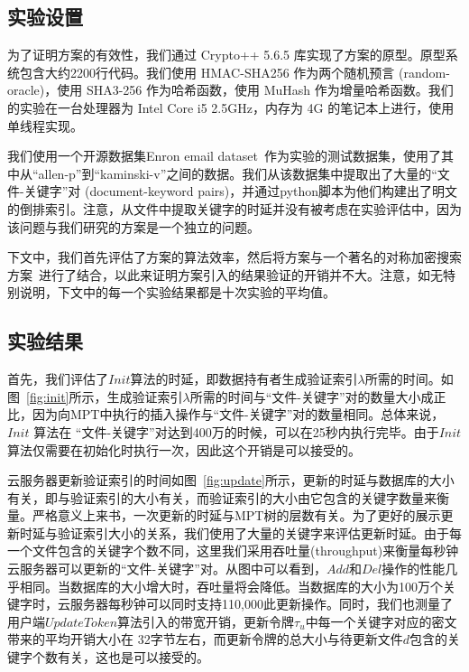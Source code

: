 \subsection{实验设置}
为了证明方案\single 的有效性，我们通过 Crypto++ 5.6.5 库实现了方案的原型。原型系统包含大约2200行代码。我们使用 HMAC-SHA256 作为两个随机预言 (random-oracle)，使用 SHA3-256 作为哈希函数，使用 MuHash 作为增量哈希函数。我们的实验在一台处理器为 Intel Core i5 2.5GHz，内存为 4G 的笔记本上进行，使用单线程实现。

我们使用一个开源数据集Enron email dataset~\cite{enron_email}作为实验的测试数据集，使用了其中从“allen-p”到“kaminski-v”之间的数据。我们从该数据集中提取出了大量的“文件-关键字”对 (document-keyword pairs)，并通过python脚本为他们构建出了明文的倒排索引。注意，从文件中提取关键字的时延并没有被考虑在实验评估中，因为该问题与我们研究的\single 方案是一个独立的问题。

下文中，我们首先评估了\single 方案的算法效率，然后将\single 方案与一个著名的对称加密搜索方案~\cite{cash2014dynamic}进行了结合，以此来证明\single 方案引入的结果验证的开销并不大。注意，如无特别说明，下文中的每一个实验结果都是十次实验的平均值。


\subsection{实验结果}
首先，我们评估了$Init$算法的时延，即数据持有者生成验证索引$\lambda$所需的时间。如图~\ref{fig:init}所示，生成验证索引$\lambda$所需的时间与“文件-关键字”对的数量大小成正比，因为向MPT中执行的插入操作与“文件-关键字”对的数量相同。总体来说，$Init$ 算法在 “文件-关键字”对达到400万的时候，可以在25秒内执行完毕。由于$Init$算法仅需要在初始化时执行一次，因此这个开销是可以接受的。

云服务器更新验证索引的时间如图~\ref{fig:update}所示，更新的时延与数据库的大小有关，即与验证索引的大小有关，而验证索引的大小由它包含的关键字数量来衡量。严格意义上来书，一次更新的时延与MPT树的层数有关。为了更好的展示更新时延与验证索引大小的关系，我们使用了大量的关键字来评估更新时延。由于每一个文件包含的关键字个数不同，这里我们采用吞吐量(throughput)来衡量每秒钟云服务器可以更新的“文件-关键字”对。从图中可以看到，$Add$和$Del$操作的性能几乎相同。当数据库的大小增大时，吞吐量将会降低。当数据库的大小为100万个关键字时，云服务器每秒钟可以同时支持110,000此更新操作。同时，我们也测量了用户端$UpdateToken$算法引入的带宽开销，更新令牌$\tau_u$中每一个关键字对应的密文带来的平均开销大小在 32字节左右，而更新令牌的总大小与待更新文件$d$包含的关键字个数有关，这也是可以接受的。


